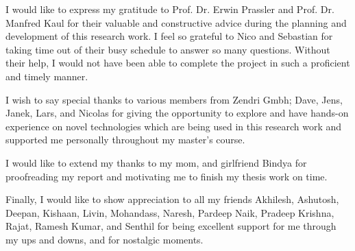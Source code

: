 

    \begin{acknowledgements}
		I would like to express my gratitude to Prof. Dr. Erwin Prassler and Prof. Dr. Manfred Kaul for their valuable and constructive advice during the planning and development of this research work. I feel so grateful to Nico and Sebastian for taking time out of their busy schedule to answer so many questions. Without their help, I would not have been able to complete the project in such a proficient and timely manner.
		
		I wish to say special thanks to various members from Zendri Gmbh; Dave, Jens, Janek, Lars, and Nicolas for giving the opportunity to explore and have hands-on experience on novel technologies which are being used in this research work and supported me personally throughout my master's course.
		
		I would like to extend my thanks to my mom, and girlfriend Bindya for proofreading my report and motivating me to finish my thesis work on time.
		
		Finally, I would like to show appreciation to all my friends Akhilesh, Ashutosh, Deepan, Kishaan, Livin, Mohandass, Naresh, Pardeep Naik, Pradeep Krishna, Rajat, Ramesh Kumar, and Senthil for being excellent support for me through my ups and downs, and for nostalgic moments.

    \end{acknowledgements}

